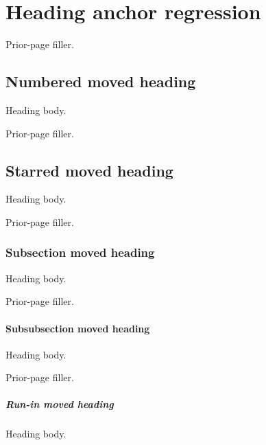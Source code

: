 \documentclass[justified,oneside,openany,nobib,nols]{tufte-book}
\newcommand{\FillBeforeHeading}{%
  \clearpage
  \noindent\rule{0pt}{\dimexpr\textheight-3\baselineskip\relax}%
  Prior-page filler.\par}
\begin{document}
\mainmatter
\tableofcontents
{}
\clearpage
\chapter{Heading anchor regression}
\FillBeforeHeading
\section{Numbered moved heading}\label{heading:numbered}
Heading body.

\FillBeforeHeading
\section*{Starred moved heading}
\label{heading:starred}
Heading body.

\FillBeforeHeading
\subsection{Subsection moved heading}\label{heading:subsection}
Heading body.

\FillBeforeHeading
\subsubsection{Subsubsection moved heading}\label{heading:subsubsection}
Heading body.

\FillBeforeHeading
\paragraph{Run-in moved heading}\label{heading:paragraph}
Heading body.
\end{document}
